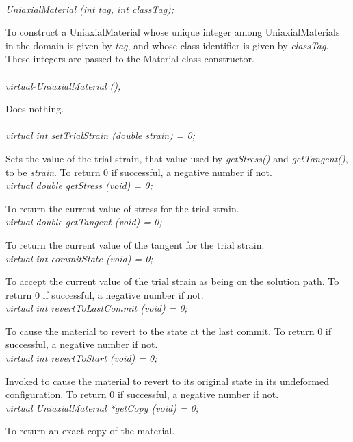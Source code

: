   \\
{\em UniaxialMaterial (int tag, int classTag);}  

To construct a UniaxialMaterial whose unique integer among
UniaxialMaterials in the domain is given by {\em tag}, and whose class
identifier is given by {\em classTag}. These integers are passed to
the Material class constructor. \\

 \\
{\em virtual $\tilde{ }$UniaxialMaterial ();} 

Does nothing. \\ 

 \\
{\em virtual int setTrialStrain (double strain) = 0; }  

Sets the value of the trial strain, that value used by {\em
getStress()} and {\em getTangent()}, to be {\em strain}. To
return $0$ if successful, a negative number if not. \\

{\em virtual double getStress (void) = 0; } 

To return the current value of stress for the trial strain. \\

{\em virtual double getTangent (void) = 0; } 

To return the current value of the tangent for the trial strain. \\

{\em virtual int commitState (void) = 0; } 

To accept the current value of the trial strain as being on the
solution path. To return $0$ if successful, a negative number if not. \\

{\em virtual int revertToLastCommit (void) = 0; } 

To cause the material to revert to the state at the last commit. To
return $0$ if successful, a negative number if not. \\

{\em virtual int revertToStart (void) = 0; } 

Invoked to cause the material to revert to its original state in its
undeformed configuration. To return $0$ if successful, a negative
number if not. \\

{\em virtual UniaxialMaterial *getCopy (void) = 0; } 

To return an exact copy of the material. \\
